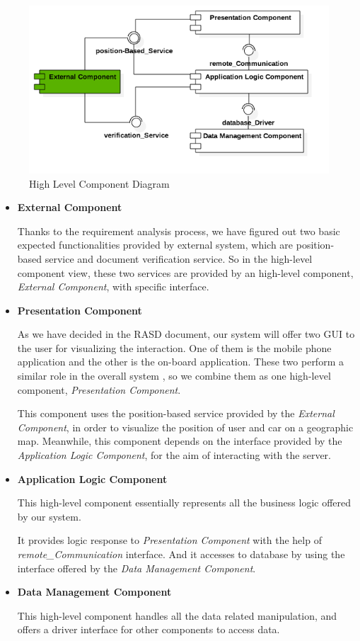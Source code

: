 \documentclass[a4paper,11pt]{article}
\begin{document}
	\begin{figure}[H]
   			\centering
   			\includegraphics[width=\textwidth]{images/high_level_CD}
  	    		\caption{High Level Component Diagram}\label{fig-high}
		\end{figure}
	\begin{itemize}
	
		\item \textbf{External Component}
		
		Thanks to the requirement analysis process, we have figured out two basic expected functionalities provided by external system, which are position-based service and document verification service. So in the high-level component view, these two services are provided by an high-level component, \textsl{External Component}, with specific interface. 
		
		\item \textbf{Presentation Component}
		
		As we have decided in the RASD document, our system will offer two GUI to the user for visualizing the interaction. One of them is the mobile phone application and the other is the on-board application. These two perform a similar role in the overall system , so we combine them as one high-level component, \textsl{Presentation Component}. 
		
		This component uses the position-based service provided by the \textsl{External Component}, in order to visualize the position of user and car on a geographic map.
		Meanwhile, this component depends on the interface provided by the \textsl{Application Logic Component}, for the aim of interacting with the server.
		
		\item \textbf{Application Logic Component}
		
		This high-level component essentially represents all the business logic offered by our system.
			
		It provides logic response to \textsl{Presentation Component} with the help of \textsl{remote\_Communication} interface.
		 And it accesses to database by using the interface offered by the \textsl{Data Management Component}.
		
		\item \textbf{Data Management Component}
		
		This high-level component handles all the data related manipulation, and offers a driver interface for other components to access data. 
	\end{itemize}	 
		
\end{document}

